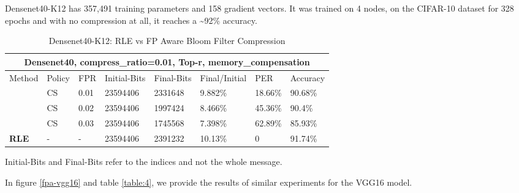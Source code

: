     Densenet40-K12 has 357,491 training parameters and 158 gradient vectors.
    It was trained on 4 nodes, on the CIFAR-10 dataset for 328 epochs and with no compression at all, it reaches a \textasciitilde92\% accuracy.
    
    \vspace{1cm}

    \begin{table}[h!]
    \footnotesize
     \centering
    \begin{tabular}{ |p{3cm}||p{1cm}|p{1cm}|p{2cm}|p{1.6cm}|p{1.6cm}|p{1.3cm}|p{1.5cm}|}
    \hline
    \multicolumn{8}{|c|}{\textbf{\footnotesize Densenet40, compress\_ratio=0.01, Top-r, memory\_compensation}} \\
    \hline
    \rule{0pt}{3ex}
    	Method & Policy & FPR  &Initial-Bits &Final-Bits &Final/Initial & PER & Accuracy\\
    \hline
    \rule{0pt}{3ex}
    \multirow{4}{*}{\textbf{Fp-Aware Bloom}}
    & CS   &0.01     &   23594406 &   2331648 &   9.882\%  &18.66\%   &90.68\%\\
    & CS   &0.02     &   23594406 &   1997424 &   8.466\%  &45.36\%   &90.4\%\\
    & CS   &0.03     &   23594406 &   1745568 &   7.398\%  &62.89\%   &85.93\%\\
    \hline
    \rule{0pt}{3ex}
    \textbf{RLE}    & - & - & 23594406 & 2391232 & 10.13\%  &0   &91.74\%\\
    \hline
    \end{tabular}
    \caption{Densenet40-K12: RLE vs FP Aware Bloom Filter Compression}
    Initial-Bits and Final-Bits refer to the indices and not the whole message. 
    \label{table:3}
    \end{table}


    \newpage
    
    In figure \ref{fpa-vgg16} and table \ref{table:4}, 
    we provide the results of similar experiments for the VGG16 model.
    
